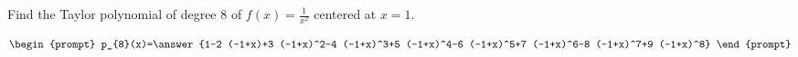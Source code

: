 \documentclass{ximera}
\author{Gregory Hartman \and Matthew Carr}
\begin{document}
\begin{exercise}




Find the Taylor polynomial of degree $8$ of $f(x)=\frac{1}{x^2}$ centered at $x=1$.

\[
\begin{prompt}
p_{8}(x)=\answer{1-2 (-1+x)+3 (-1+x)^2-4 (-1+x)^3+5 (-1+x)^4-6 (-1+x)^5+7
   (-1+x)^6-8 (-1+x)^7+9 (-1+x)^8}
\end{prompt}
\]

\end{exercise}
\end{document}
